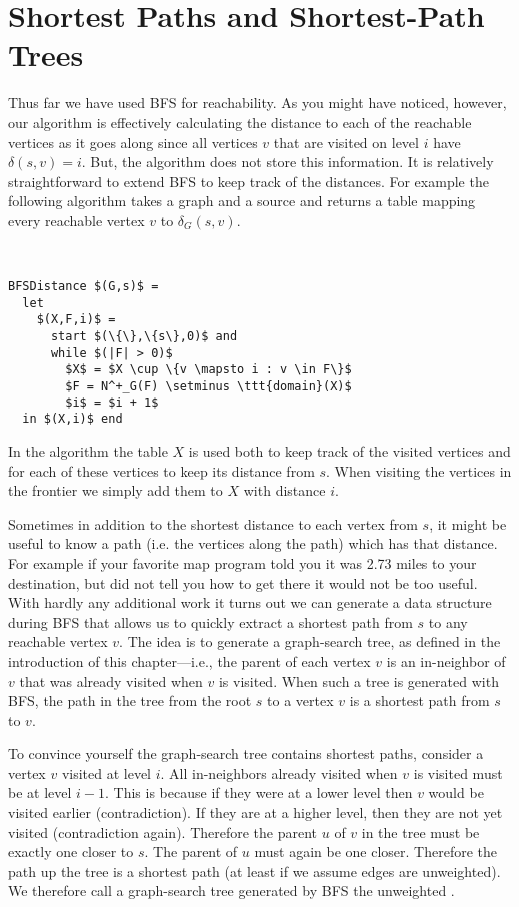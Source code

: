 \section{Shortest Paths and Shortest-Path Trees}

Thus far we have used BFS for reachability.  As you might have
noticed, however, our  algorithm is effectively
calculating the distance to each of the reachable vertices as it goes
along since all vertices $v$ that are visited on level $i$ have
$\delta(s,v) = i$.       But, the algorithm does not store this
information.     
It is relatively straightforward to extend BFS to keep track
of the distances.
For example the following algorithm takes a graph and a source and 
returns a table mapping every reachable vertex $v$ to $\delta_G(s,v)$.
\begin{algorithm}~
\label{alg::bfsdistance}
\begin{lstlisting}
BFSDistance $(G,s)$ = 
  let 
    $(X,F,i)$ = 
      start $(\{\},\{s\},0)$ and
      while $(|F| > 0)$ 
        $X$ = $X \cup \{v \mapsto i : v \in F\}$
        $F = N^+_G(F) \setminus \ttt{domain}(X)$
        $i$ = $i + 1$          
  in $(X,i)$ end
\end{lstlisting}
\end{algorithm}
In the algorithm the table $X$ is used both to keep track of the
visited vertices and for each of these vertices to keep its distance
from $s$.  When visiting the vertices in the frontier we simply add
them to $X$ with distance $i$.

Sometimes in addition to the shortest distance to each vertex from
$s$, it might be useful to know a path (i.e. the vertices along the
path) which has that distance.  For example if your favorite map
program told you it was 2.73 miles to your destination, but did not
tell you how to get there it would not be too useful.  With hardly any
additional work it turns out we can generate a data structure during
BFS that allows us to quickly extract a shortest path from $s$ to any
reachable vertex $v$.  The idea is to generate a graph-search tree, as
defined in the introduction of this chapter---i.e., the parent of each
vertex $v$ is an in-neighbor of $v$ that was already visited when $v$
is visited.  When such a tree is generated with BFS, the path in the
tree from the root $s$ to a vertex $v$ is a shortest path from $s$ to
$v$.

To convince yourself the graph-search tree contains shortest paths,
consider a vertex $v$ visited at level $i$.  All in-neighbors already
visited when $v$ is visited must be at level $i-1$.  This is because
if they were at a lower level then $v$ would be visited earlier
(contradiction).  If they are at a higher level, then they are not yet
visited (contradiction again).  Therefore the parent $u$ of $v$ in the
tree must be exactly one closer to $s$.  The parent of $u$ must again
be one closer.  Therefore the path up the tree is a shortest path (at
least if we assume edges are unweighted).  We
therefore call a graph-search tree generated by BFS the unweighted
.

